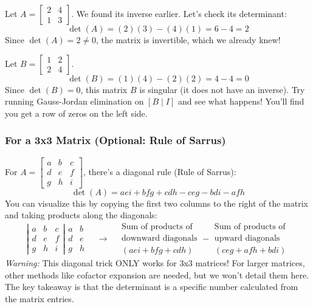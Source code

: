 \documentclass[11pt]{article}
\begin{document}
\begin{example}
Let $A = \begin{bmatrix} 2 & 4 \\ 1 & 3 \end{bmatrix}$. We found its inverse earlier. Let's check its determinant:
\[ \det(A) = (2)(3) - (4)(1) = 6 - 4 = 2 \]
Since $\det(A) = 2 \neq 0$, the matrix is invertible, which we already knew!

Let $B = \begin{bmatrix} 1 & 2 \\ 2 & 4 \end{bmatrix}$.
\[ \det(B) = (1)(4) - (2)(2) = 4 - 4 = 0 \]
Since $\det(B) = 0$, this matrix $B$ is singular (it does not have an inverse). Try running Gauss-Jordan elimination on $[B \mid I]$ and see what happens! You'll find you get a row of zeros on the left side.
\end{example}

\subsubsection{For a 3x3 Matrix (Optional: Rule of Sarrus)}
For $A = \begin{bmatrix} a & b & c \\ d & e & f \\ g & h & i \end{bmatrix}$, there's a diagonal rule (Rule of Sarrus):
\[ \det(A) = aei + bfg + cdh - ceg - bdi - afh \]
You can visualize this by copying the first two columns to the right of the matrix and taking products along the diagonals:
\[
\left| \begin{matrix} a & b & c \\ d & e & f \\ g & h & i \end{matrix} \right|
\begin{matrix} a & b \\ d & e \\ g & h \end{matrix}
\quad \longrightarrow \quad
\begin{array}{c} \text{Sum of products of} \\ \text{downward diagonals} \\ (aei + bfg + cdh) \end{array}
-
\begin{array}{c} \text{Sum of products of} \\ \text{upward diagonals} \\ (ceg + afh + bdi) \end{array}
\]
\textit{Warning:} This diagonal trick ONLY works for 3x3 matrices! For larger matrices, other methods like cofactor expansion are needed, but we won't detail them here. The key takeaway is that the determinant is a specific number calculated from the matrix entries.
\end{document}
